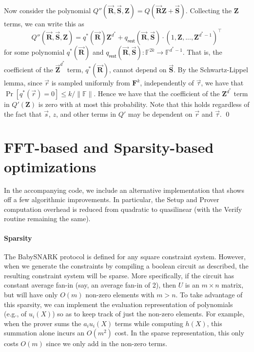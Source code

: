 \documentclass{article}
\theoremstyle{definition}
\theoremstyle{remark}
\newcommand{\F}{\mathbb{F}}
\begin{document}
Now consider the polynomial $Q''(\vec{\mathbf{R}}, \vec{\mathbf{S}}, \mathbf{Z}) = Q(\vec{\mathbf{R}} \mathbf{Z} + \vec{\mathbf{S}})$. Collecting the $\mathbf{Z}$ terms, we can write this as
\[
  Q''(\vec{\mathbf{R}}, \vec{\mathbf{S}}, \mathbf{Z}) = 
     q^*(\vec{\mathbf{R}}) \mathbf{Z}^{d^*} + q_\textsf{rest}(\vec{\mathbf{R}},\vec{\mathbf{S}}) \cdot \left( 1, \mathbf{Z}, ..., \mathbf{Z}^{d^*-1} \right)^\intercal
\]
for some polynomial $q^*(\vec{\mathbf{R}})$ and $q_\textsf{rest}(\vec{\mathbf{R}},\vec{\mathbf{S}}) : \F^{2k} \rightarrow \F^{d^*-1}$. That is, the coefficient of the $\vec{\mathbf{Z}}^{d^*}$ term, $q^*(\vec{\mathbf{R}})$, cannot depend on $\mathbf{\vec{S}}$. 
By the Schwartz-Lippel lemma, since $\vec{r}$ is sampled uniformly from $\mathbf{F}^k$, independently of $\vec{\tau}$, we have that $\Pr \left[ q^*(\vec{r}) = 0\right] \le k / \| \F \|$. Hence we have that the coefficient of the $\mathbf{Z}^{d^*}$ term in $Q'(\mathbf{Z})$ is zero with at most this probability. Note that this holds regardless of the fact that $\vec{s}$, $z$, and other terms in $Q'$ may be dependent on $\vec{r}$ and $\vec{\tau}$.
\qed

\section{FFT-based and Sparsity-based optimizations}
In the accompanying code, we include an alternative implementation that shows off a few algorithmic improvements. In particular, the Setup and Prover computation overhead is reduced from quadratic to quasilinear (with the Verify routine remaining the same).

\paragraph{Sparsity}
The BabySNARK protocol is defined for any square constraint system.
However, when we generate the constraints by compiling a boolean circuit as described, 
the resulting constraint system will be sparse.
More specifically, if the circuit has constant average fan-in (say, an average fan-in of 2), then $U$ is an $m \times n$ matrix, but will have only $O(m)$ non-zero elements with $m > n$.
To take advantage of this sparsity, we can implement the evaluation representation of polynomials (e.g., of $u_i(X)$) so as to keep track of just the non-zero elements.
For example, when the prover sums the $a_i u_i(X)$ terms while computing $h(X)$, this summation alone incurs an $O(m^2)$ cost. In the sparse representation, this only costs $O(m)$ since we only add in the non-zero terms.
\end{document}
